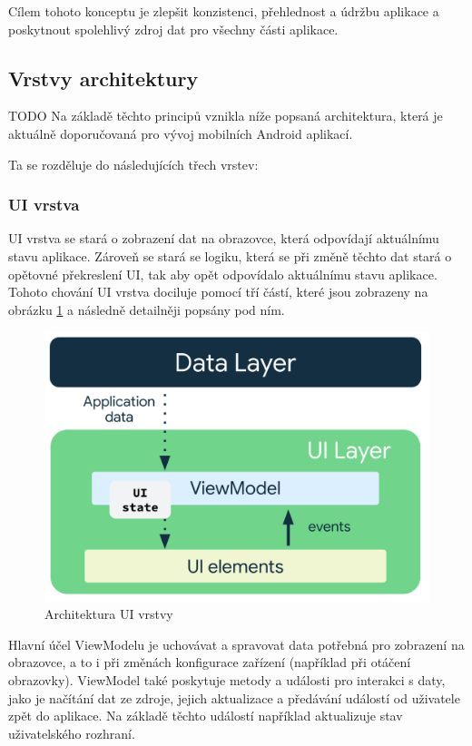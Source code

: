 Cílem tohoto konceptu je zlepšit konzistenci, přehlednost a údržbu aplikace a poskytnout spolehlivý zdroj dat pro všechny části aplikace.


\subsection{Vrstvy architektury} \label{vrstvyArchitekturySection} 
TODO %
Na základě těchto principů vznikla níže popsaná architektura, která je aktuálně doporučovaná pro vývoj mobilních Android aplikací.

Ta se rozděluje do následujících třech vrstev:

\subsubsection*{UI vrstva} \label{UILayerNavrh}
UI vrstva se stará o zobrazení dat na obrazovce, která odpovídají aktuálnímu stavu aplikace. Zároveň se stará se logiku, která
se při změně těchto dat stará o opětovné překreslení UI, tak aby opět odpovídalo aktuálnímu stavu aplikace. Tohoto chování UI vrstva 
dociluje pomocí tří částí, které jsou zobrazeny na obrázku \ref{fig:arch_ui_udf} a následně detailněji popsány pod ním.

\begin{figure}[H]
  \centering
  \includegraphics[width=.5\textwidth]{arch-ui-udf.png}
  \caption{Architektura UI vrstvy}
  \label{fig:arch_ui_udf}
\end{figure}

Hlavní účel ViewModelu je uchovávat a spravovat data potřebná pro zobrazení na obrazovce, a to i při změnách konfigurace zařízení 
(například při otáčení obrazovky). ViewModel také poskytuje metody a události pro interakci s daty, jako je načítání dat ze zdroje, 
jejich aktualizace a předávání událostí od uživatele zpět do aplikace. Na základě těchto událostí například aktualizuje stav uživatelského
rozhraní. %

